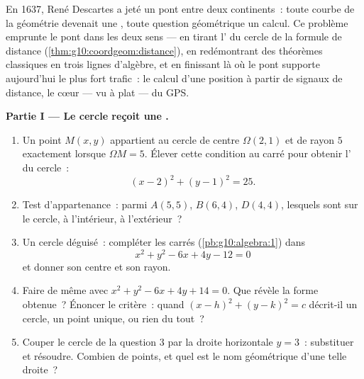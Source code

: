 \begin{problem}
\label{pb:g10:coordgeom:1}
En 1637, René Descartes a jeté un pont entre deux continents~: toute
courbe de la géométrie devenait une \emph{}, toute question
géométrique un calcul. Ce problème emprunte le pont dans les deux
sens --- en tirant l' du cercle de la formule de distance
(\cref{thm:g10:coordgeom:distance}), en redémontrant des théorèmes
classiques en trois lignes d'algèbre, et en finissant là où le pont
supporte aujourd'hui le plus fort trafic~: le calcul d'une position à
partir de signaux de distance, le cœur --- vu à plat --- du GPS.

\medskip
\noindent\textbf{Partie I --- Le cercle reçoit une .}
\begin{enumerate}
  \item Un point $M(x, y)$ appartient au cercle de centre
        $\Omega(2, 1)$ et de rayon $5$ exactement lorsque
        $\Omega M = 5$. Élever cette condition au carré pour obtenir
        l' du cercle~:
        \[
        (x - 2)^2 + (y - 1)^2 = 25 .
        \]
  \item Test d'appartenance~: parmi $A(5, 5)$, $B(6, 4)$, $D(4, 4)$,
        lesquels sont sur le cercle, à l'intérieur, à l'extérieur~?
  \item Un cercle déguisé~: compléter les carrés
        (\cref{pb:g10:algebra:1}) dans
        \[
        x^2 + y^2 - 6x + 4y - 12 = 0
        \]
        et donner son centre et son rayon.
  \item Faire de même avec $x^2 + y^2 - 6x + 4y + 14 = 0$. Que
        révèle la forme obtenue~? Énoncer le critère~: quand
        $(x - h)^2 + (y - k)^2 = c$ décrit-il un cercle, un point
        unique, ou rien du tout~?
  \item Couper le cercle de la question 3 par la droite horizontale
        $y = 3$~: substituer et résoudre. Combien de points, et
        quel est le nom géométrique d'une telle droite~?
\end{enumerate}


\end{problem}
